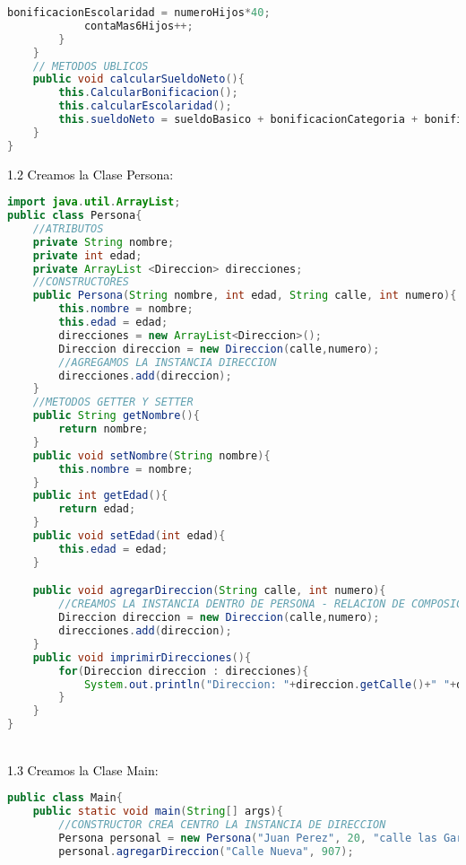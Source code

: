 \documentclass{article}
\begin{document}
\begin{itemize}
\begin{itemize}
\begin{lstlisting}[language=java]
            bonificacionEscolaridad = numeroHijos*40;
            contaMas6Hijos++;
        }
    }
    // METODOS UBLICOS
    public void calcularSueldoNeto(){
        this.CalcularBonificacion();
        this.calcularEscolaridad();
        this.sueldoNeto = sueldoBasico + bonificacionCategoria + bonificacionEscolaridad;
    }
}
        \end{lstlisting}
        \textcolor{black}{1.2 Creamos la Clase Persona:} 
		\begin{lstlisting}[language=java]
import java.util.ArrayList;
public class Persona{
    //ATRIBUTOS
    private String nombre;
    private int edad;
    private ArrayList <Direccion> direcciones;
    //CONSTRUCTORES
    public Persona(String nombre, int edad, String calle, int numero){
        this.nombre = nombre;
        this.edad = edad;
        direcciones = new ArrayList<Direccion>(); 
        Direccion direccion = new Direccion(calle,numero);
        //AGREGAMOS LA INSTANCIA DIRECCION
        direcciones.add(direccion);
    }
    //METODOS GETTER Y SETTER
    public String getNombre(){
        return nombre;
    }
    public void setNombre(String nombre){
        this.nombre = nombre;
    }
    public int getEdad(){
        return edad;
    }
    public void setEdad(int edad){
        this.edad = edad;
    }

    public void agregarDireccion(String calle, int numero){
        //CREAMOS LA INSTANCIA DENTRO DE PERSONA - RELACION DE COMPOSICION
        Direccion direccion = new Direccion(calle,numero);
        direcciones.add(direccion);
    }
    public void imprimirDirecciones(){
        for(Direccion direccion : direcciones){
            System.out.println("Direccion: "+direccion.getCalle()+" "+direccion.getNumero());
        }
    }
}
        \end{lstlisting}
        \newline
        \\
        \textcolor{black}{1.3 Creamos la Clase Main:} 
		\begin{lstlisting}[language=java]
public class Main{
    public static void main(String[] args){
        //CONSTRUCTOR CREA CENTRO LA INSTANCIA DE DIRECCION
        Persona personal = new Persona("Juan Perez", 20, "calle las Gardenias", 458);
        personal.agregarDireccion("Calle Nueva", 907);


\end{lstlisting}
\end{itemize}
\end{itemize}
\end{document}
